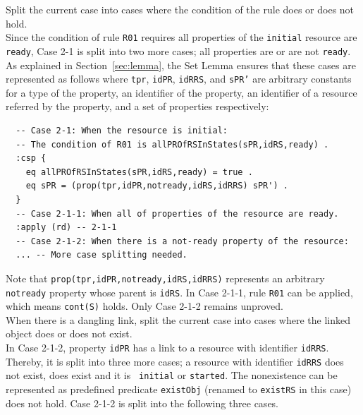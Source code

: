 \documentclass[12pt]{report}
\newcommand{\stt}[1]{{\small{\tt {#1}}}}
\begin{document}
 Split the current case into cases where
the condition of the rule does or does not hold. \\
Since the condition of rule {\tt R01} requires all properties of the
{\tt initial} resource are {\tt ready}, Case 2-1 is split into two
more cases; all properties are or are not {\tt ready}. As explained in
Section~\ref{sec:lemma}, the Set Lemma ensures that these cases are
represented as follows where {\tt tpr}, {\tt idPR}, {\tt idRRS}, and
{\tt sPR'} are arbitrary constants for a type of the property, an
identifier of the property, an identifier of a resource referred by
the property, and a set of properties respectively:
\small
\begin{verbatim}
  -- Case 2-1: When the resource is initial:
  -- The condition of R01 is allPROfRSInStates(sPR,idRS,ready) .
  :csp { 
    eq allPROfRSInStates(sPR,idRS,ready) = true .
    eq sPR = (prop(tpr,idPR,notready,idRS,idRRS) sPR') .
  }
  -- Case 2-1-1: When all of properties of the resource are ready.
  :apply (rd) -- 2-1-1
  -- Case 2-1-2: When there is a not-ready property of the resource:
  ... -- More case splitting needed.
\end{verbatim}
\normalsize
Note that \stt{prop(tpr,idPR,notready,idRS,idRRS)} represents an
arbitrary {\tt notready} property whose parent is {\tt idRS}. In Case
2-1-1, rule {\tt R01} can be applied, which means \stt{cont(S)} holds. Only
Case 2-1-2 remains unproved.\\

 When there is a dangling link, split the
current case into cases where the linked object does or does not
exist. \\
In Case 2-1-2, property {\tt idPR} has a link to a resource with identifier
{\tt idRRS}. Thereby, it is split into three more cases; a resource
with identifier {\tt idRRS} does not exist, does exist and it is {\tt
  initial} or {\tt started}. The nonexistence can be represented as
predefined predicate {\tt existObj} (renamed to {\tt existRS} in this
case) does not hold. Case 2-1-2 is split into the following three
cases.
\end{document}
